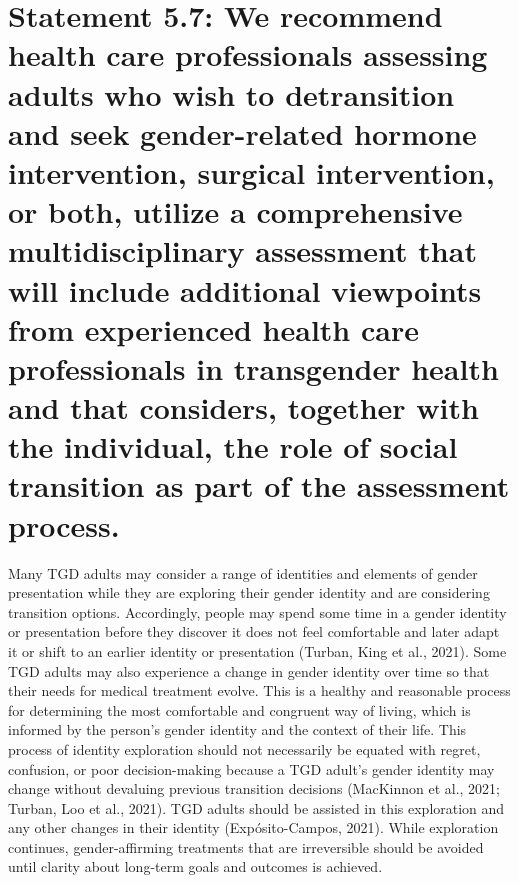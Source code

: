 \documentclass[
]{book}
\begin{document}
\hypertarget{statement-5.7-we-recommend-health-care-professionals-assessing-adults-who-wish-to-detransition-and-seek-gender-related-hormone-intervention-surgical-intervention-or-both-utilize-a-comprehensive-multidisciplinary-assessment-that-will-include-additional-viewpoints-from-experienced-health-care-professionals-in-transgender-health-and-that-considers-together-with-the-individual-the-role-of-social-transition-as-part-of-the-assessment-process.}{%
\section*{Statement 5.7: We recommend health care professionals assessing adults who wish to detransition and seek gender-related hormone intervention, surgical intervention, or both, utilize a comprehensive multidisciplinary assessment that will include additional viewpoints from experienced health care professionals in transgender health and that considers, together with the individual, the role of social transition as part of the assessment process.}\label{statement-5.7-we-recommend-health-care-professionals-assessing-adults-who-wish-to-detransition-and-seek-gender-related-hormone-intervention-surgical-intervention-or-both-utilize-a-comprehensive-multidisciplinary-assessment-that-will-include-additional-viewpoints-from-experienced-health-care-professionals-in-transgender-health-and-that-considers-together-with-the-individual-the-role-of-social-transition-as-part-of-the-assessment-process.}}

Many TGD adults may consider a range of
identities and elements of gender presentation
while they are exploring their gender identity and
are considering transition options. Accordingly,
people may spend some time in a gender identity
or presentation before they discover it does not
feel comfortable and later adapt it or shift to an
earlier identity or presentation (Turban, King
et al., 2021). Some TGD adults may also experience a change in gender identity over time so
that their needs for medical treatment evolve.
This is a healthy and reasonable process for determining the most comfortable and congruent way
of living, which is informed by the person's gender identity and the context of their life. This
process of identity exploration should not necessarily be equated with regret, confusion, or poor
decision-making because a TGD adult's gender
identity may change without devaluing previous
transition decisions (MacKinnon et al., 2021;
Turban, Loo et al., 2021). TGD adults should be
assisted in this exploration and any other changes
in their identity (Expósito-Campos, 2021). While
exploration continues, gender-affirming treatments
that are irreversible should be avoided until clarity
about long-term goals and outcomes is achieved.
\end{document}
